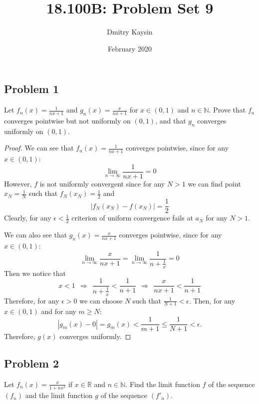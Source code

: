 \documentclass{article}
\title{18.100B: Problem Set 9}
\author{Dmitry Kaysin}
\date{February 2020}
\begin{document}
\maketitle 


\subsection*{Problem 1}

\begin{tcolorbox}
Let $f_n(x) = \frac{1}{nx+1}$ and $g_n(x) = \frac{x}{nx+1}$ for $x \in (0, 1)$ and $n \in \mathbb{N}$.
Prove that $f_n$ converges pointwise but not uniformly on $(0, 1)$, and that $g_n$ converges uniformly on $(0, 1)$.
\end{tcolorbox}

\begin{proof}

We can see that $f_n(x) = \frac{1}{nx+1}$ converges pointwise, since for any $x \in (0,1)$:
\[ \lim_{n \to \infty} \frac{1}{nx+1} = 0 \]
However, $f$ is not uniformly convergent since for any $N > 1$ we can find point $x_N = \frac{1}{N}$ such that $f_N(x_N) = \frac{1}{2}$ and
$$ | f_N(x_N) - f(x_N) | = \frac{1}{2} $$
Clearly, for any $\epsilon < \frac{1}{2}$ criterion of uniform convergence fails at $a_N$ for any $N > 1$.

We can also see that $g_n(x) = \frac{x}{nx+1}$ converges pointwise, since for any $x \in (0,1)$:
\[ \lim_{n \to \infty} \frac{x}{nx+1} = \lim_{n \to \infty} \frac{1}{n+\frac{1}{x}} = 0 \]
Then we notice that
\[ x < 1 \>\> \Rightarrow \>\> \frac{1}{n+\frac{1}{x}} < \frac{1}{n+1} \>\> \Rightarrow \>\> \frac{x}{nx+1} < \frac{1}{n+1} \]
Therefore, for any $\epsilon>0$ we can choose $N$ such that $ \frac{1}{N+1} < \epsilon$.
Then, for any $x \in (0,1)$ and for any $m \geq N$:
\[ | g_m(x) - 0 | = g_m(x) < \frac{1}{m+1} \leq \frac{1}{N+1} < \epsilon. \]
Therefore, $g(x)$ converges uniformly.

\end{proof}


\subsection*{Problem 2}

\begin{tcolorbox}
Let $f_n (x) = \frac{x}{1 + nx^2}$ if $x \in \mathbb{R}$ and $n \in \mathbb{N}$.
Find the limit function $f$ of the sequence $(f_n)$ and the limit function $g$ of the sequence $(f'_n)$. 
\end{tcolorbox}
\end{document}
